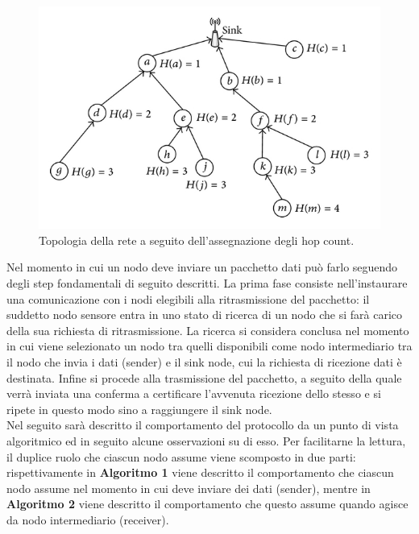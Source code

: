 \documentclass[binding=0.6cm,TFA]{sapthesis}
\begin{document}
\begin{figure}
    \begin{center}
        \includegraphics[scale=1.7]{hop-count-algorithm.png}
        \caption{Topologia della rete a seguito dell'assegnazione degli hop count.}
    \end{center}
\end{figure}

Nel momento in cui un nodo deve inviare un pacchetto dati può farlo seguendo degli step fondamentali di seguito descritti.
La prima fase consiste nell'instaurare una comunicazione con i nodi elegibili alla ritrasmissione del pacchetto: il suddetto nodo sensore
entra in uno stato di ricerca di un nodo che si farà carico della sua richiesta di ritrasmissione. La ricerca si considera conclusa
nel momento in cui viene selezionato un nodo tra quelli disponibili come nodo intermediario tra il nodo che invia i dati (sender) e il sink
node, cui la richiesta di ricezione dati è destinata. Infine si procede alla trasmissione del pacchetto, a seguito della quale
verrà inviata una conferma a certificare l'avvenuta ricezione dello stesso e si ripete in questo modo sino a raggiungere
il sink node.\\

Nel seguito sarà descritto il comportamento del protocollo da un punto di vista algoritmico ed in seguito alcune osservazioni su di esso.
Per facilitarne la lettura, il duplice ruolo che ciascun nodo assume viene scomposto in due parti: rispettivamente in \textbf{Algoritmo 1}
viene descritto il comportamento che ciascun nodo assume nel momento in cui deve inviare dei dati (sender), mentre in \textbf{Algoritmo 2}
viene descritto il comportamento che questo assume quando agisce da nodo intermediario (receiver).
\end{document}
